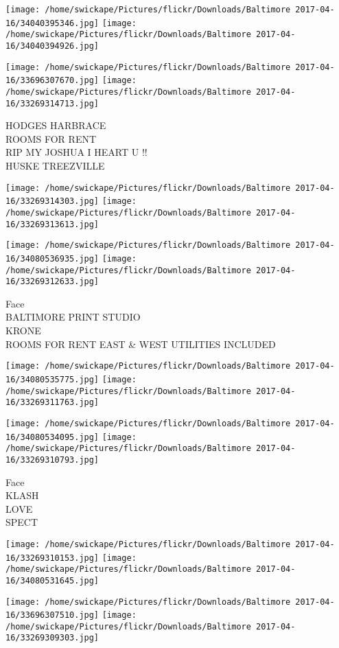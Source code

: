 \documentclass[10pt,letterpaper]{article}
\begin{document}
\texttt{[image: /home/swickape/Pictures/flickr/Downloads/Baltimore 2017-04-16/34040395346.jpg]}
\texttt{[image: /home/swickape/Pictures/flickr/Downloads/Baltimore 2017-04-16/34040394926.jpg]}

\texttt{[image: /home/swickape/Pictures/flickr/Downloads/Baltimore 2017-04-16/33696307670.jpg]}
\texttt{[image: /home/swickape/Pictures/flickr/Downloads/Baltimore 2017-04-16/33269314713.jpg]}

HODGES HARBRACE\\
ROOMS FOR RENT\\
RIP MY JOSHUA I HEART U !!\\
HUSKE TREEZVILLE
\pagebreak

\texttt{[image: /home/swickape/Pictures/flickr/Downloads/Baltimore 2017-04-16/33269314303.jpg]}
\texttt{[image: /home/swickape/Pictures/flickr/Downloads/Baltimore 2017-04-16/33269313613.jpg]}

\texttt{[image: /home/swickape/Pictures/flickr/Downloads/Baltimore 2017-04-16/34080536935.jpg]}
\texttt{[image: /home/swickape/Pictures/flickr/Downloads/Baltimore 2017-04-16/33269312633.jpg]}

Face\\
BALTIMORE PRINT STUDIO\\
KRONE\\
ROOMS FOR RENT EAST \& WEST UTILITIES INCLUDED
\pagebreak

\texttt{[image: /home/swickape/Pictures/flickr/Downloads/Baltimore 2017-04-16/34080535775.jpg]}
\texttt{[image: /home/swickape/Pictures/flickr/Downloads/Baltimore 2017-04-16/33269311763.jpg]}

\texttt{[image: /home/swickape/Pictures/flickr/Downloads/Baltimore 2017-04-16/34080534095.jpg]}
\texttt{[image: /home/swickape/Pictures/flickr/Downloads/Baltimore 2017-04-16/33269310793.jpg]}

Face\\
KLASH\\
LOVE\\
SPECT
\pagebreak

\texttt{[image: /home/swickape/Pictures/flickr/Downloads/Baltimore 2017-04-16/33269310153.jpg]}
\texttt{[image: /home/swickape/Pictures/flickr/Downloads/Baltimore 2017-04-16/34080531645.jpg]}

\texttt{[image: /home/swickape/Pictures/flickr/Downloads/Baltimore 2017-04-16/33696307510.jpg]}
\texttt{[image: /home/swickape/Pictures/flickr/Downloads/Baltimore 2017-04-16/33269309303.jpg]}
\end{document}
